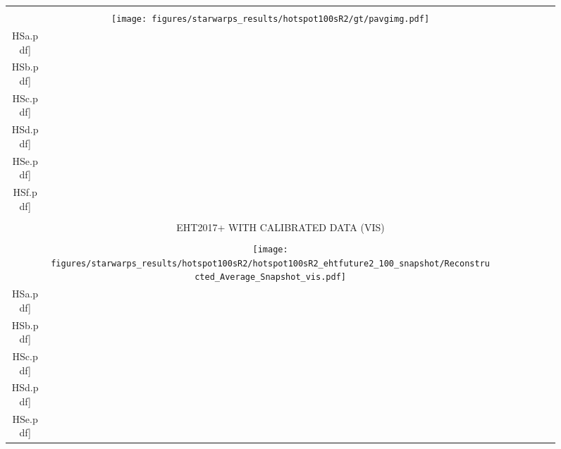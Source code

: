 \begin{figure}[h!]
\begin{center}
\begin{tabular}{  c | c | c  c  c  c  c c }
			&\vspace{-.1in} &&&&&&\\
			\multirow{1}{*}[.5in]{ \rotatebox[origin=t]{90}{\large{\textsf{Truth}} }}
			&
			{{\texttt{[image: figures/starwarps\_results/hotspot100sR2/gt/pavgimg.pdf]}} } &
			\texttt{[image: figures/starwarps\_results/hotspot100sR2/gt/frames/gt\_noaxis\_\\HSa.pdf]} &
			\texttt{[image: figures/starwarps\_results/hotspot100sR2/gt/frames/gt\_noaxis\_\\HSb.pdf]} &
			\texttt{[image: figures/starwarps\_results/hotspot100sR2/gt/frames/gt\_noaxis\_\\HSc.pdf]} &
			\texttt{[image: figures/starwarps\_results/hotspot100sR2/gt/frames/gt\_noaxis\_\\HSd.pdf]} &
			\texttt{[image: figures/starwarps\_results/hotspot100sR2/gt/frames/gt\_noaxis\_\\HSe.pdf]} &
			\texttt{[image: figures/starwarps\_results/hotspot100sR2/gt/frames/gt\_noaxis\_\\HSf.pdf]} 
			\\   \hline
			&\vspace{-.1in} &&&&&&\\
			\multicolumn{8}{c}{  \large{\textsf{EHT2017+ WITH CALIBRATED DATA (VIS) }}  }
			\\ \hline
			&\vspace{-.1in} &&&&&&\\
			\multirow{1}{*}[.5in]{ \rotatebox[origin=t]{90}{\small{\textsf{Snapshot}} }}
			&
			{{\texttt{[image: figures/starwarps\_results/hotspot100sR2/hotspot100sR2\_ehtfuture2\_100\_snapshot/Reconstructed\_Average\_Snapshot\_vis.pdf]}} } &
			\texttt{[image: figures/starwarps\_results/hotspot100sR2/hotspot100sR2\_ehtfuture2\_100\_snapshot/Reconstructed\_Snapshot\_vis\_\\HSa.pdf]} &
			\texttt{[image: figures/starwarps\_results/hotspot100sR2/hotspot100sR2\_ehtfuture2\_100\_snapshot/Reconstructed\_Snapshot\_vis\_\\HSb.pdf]} &
			\texttt{[image: figures/starwarps\_results/hotspot100sR2/hotspot100sR2\_ehtfuture2\_100\_snapshot/Reconstructed\_Snapshot\_vis\_\\HSc.pdf]} &
			\texttt{[image: figures/starwarps\_results/hotspot100sR2/hotspot100sR2\_ehtfuture2\_100\_snapshot/Reconstructed\_Snapshot\_vis\_\\HSd.pdf]} &
			\texttt{[image: figures/starwarps\_results/hotspot100sR2/hotspot100sR2\_ehtfuture2\_100\_snapshot/Reconstructed\_Snapshot\_vis\_\\HSe.pdf]} &

\end{tabular}
\end{center}
\end{figure}
